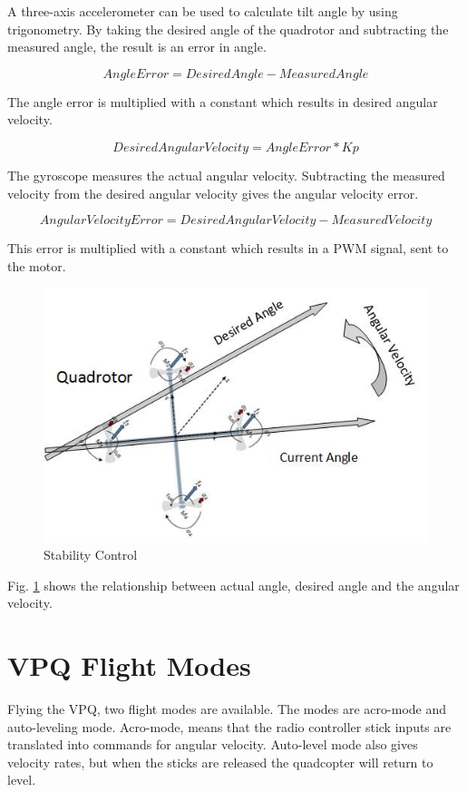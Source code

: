 A three-axis accelerometer can be used to calculate tilt angle by using trigonometry. \bigskip
By taking the desired angle of the quadrotor and subtracting the measured angle, the result is an error in angle.

\begin{equation}
   Angle Error = Desired Angle - Measured Angle
\end{equation}

The angle error is multiplied with a constant which results in desired angular velocity. 

\begin{equation}
   Desired Angular Velocity = Angle Error * Kp
\end{equation}

The gyroscope measures the actual angular velocity. Subtracting the measured velocity from the desired angular velocity gives the angular velocity error. 

\begin{equation}
   Angular Velocity Error = Desired Angular Velocity - Measured Velocity
\end{equation}

This error is multiplied with a constant which results in a PWM signal, sent to the motor.
\begin{figure}[H]
          \centering
            \includegraphics[scale = 0.67]{VAPIQ-PICTURES/OnBCS.jpg}
                \caption{Stability Control}
                \label{fig:Stab}
\end{figure} 

Fig. \ref{fig:Stab} shows the relationship between actual angle, desired angle and the angular velocity. 

\section{VPQ Flight Modes}
Flying the VPQ, two flight modes are available. The modes are acro-mode and auto-leveling mode. Acro-mode, means that the radio controller stick inputs are translated into commands for angular velocity. Auto-level mode also gives velocity rates, but when the sticks are released the quadcopter will return to level.

